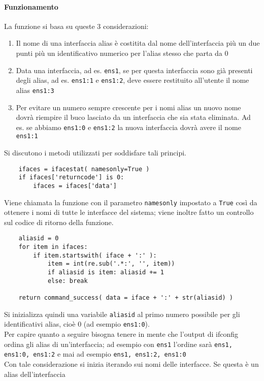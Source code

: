 \documentclass[11pt]{article}
\begin{document}
\paragraph{Funzionamento}
La funzione si basa su queste 3 considerazioni:
\begin{enumerate}
	\item{Il nome di una interfaccia alias è costitita dal nome dell'interfaccia più un due punti più
		un identificativo numerico per l'alias stesso che parta da 0}
	\item{Data una interfaccia, ad es. \texttt{ens1}, se per questa interfaccia sono già presenti degli alias, ad es.
		\texttt{ens1:1} e \texttt{ens1:2}, deve essere restituito all'utente il nome alias \texttt{ens1:3}}
	\item{Per evitare un numero sempre crescente per i nomi alias un nuovo nome dovrà riempire
		il buco lasciato da un interfaccia che sia stata eliminata. Ad es. se abbiamo \texttt{ens1:0} e \texttt{ens1:2}
		la nuova interfaccia dovrà avere il nome \texttt{ens1:1}}
\end{enumerate}
Si discutono i metodi utilizzati per soddisfare tali principi.
\begin{lstlisting}
    ifaces = ifacestat( namesonly=True )
    if ifaces['returncode'] is 0:
        ifaces = ifaces['data']
\end{lstlisting}
Viene chiamata la funzione  con il parametro \texttt{namesonly} impostato a \texttt{True}
così da ottenere i nomi di tutte le interfacce del sistema; viene inoltre fatto un controllo
sul codice di ritorno della funzione.
\begin{lstlisting}
    aliasid = 0
    for item in ifaces:
        if item.startswith( iface + ':' ):
            item = int(re.sub('.*:', '', item))
            if aliasid is item: aliasid += 1
            else: break

    return command_success( data = iface + ':' + str(aliasid) )
\end{lstlisting}
Si inizializza quindi una variabile \texttt{aliasid} al primo numero possibile per gli identificativi alias,
cioè 0 (ad esempio \texttt{ens1:0}).\\
Per capire quanto a seguire bisogna tenere in mente che l'output di ifconfig ordina gli alias di
un'interfaccia; ad esempio con \texttt{ens1} l'ordine sarà \texttt{ens1, ens1:0, ens1:2}
e mai ad esempio \texttt{ens1, ens1:2, ens1:0}\\
Con tale considerazione si inizia iterando sui nomi delle interfacce. Se questa è un alias dell'interfaccia
\end{document}
